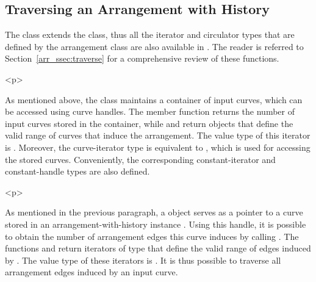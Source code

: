 \subsection{Traversing an Arrangement with History}
\label{arr_ssec:arrwh_traverse}
%
The  class extends the 
class, thus all the iterator and circulator types that are defined by the
arrangement class are also available in .
The reader is referred to Section~\ref{arr_ssec:traverse} for a comprehensive
review of these functions.

\begin{ccHtmlOnly}<p>\end{ccHtmlOnly}
As mentioned above, the  class maintains
a container of input curves, which can be accessed using curve handles.
The member function  returns the number of input 
curves stored in the container, while  and 
 return 
objects that define the  valid range of curves that induce the arrangement.
The value type of this iterator is . Moreover, the curve-iterator
type is equivalent to  , which
is used for accessing the stored curves. Conveniently, the corresponding
constant-iterator and constant-handle types are also defined.

\begin{ccHtmlOnly}<p>\end{ccHtmlOnly}
As mentioned in the previous paragraph, a  object  
serves as a pointer to a curve stored in an arrangement-with-history instance 
. Using this handle, it is possible to obtain the number of 
arrangement edges this curve induces by calling 
. The functions 
 and
 return iterators of type
 that define the
valid range of edges induced by . The value type of these iterators
is . It is thus possible to traverse all arrangement
edges induced by an input curve.

